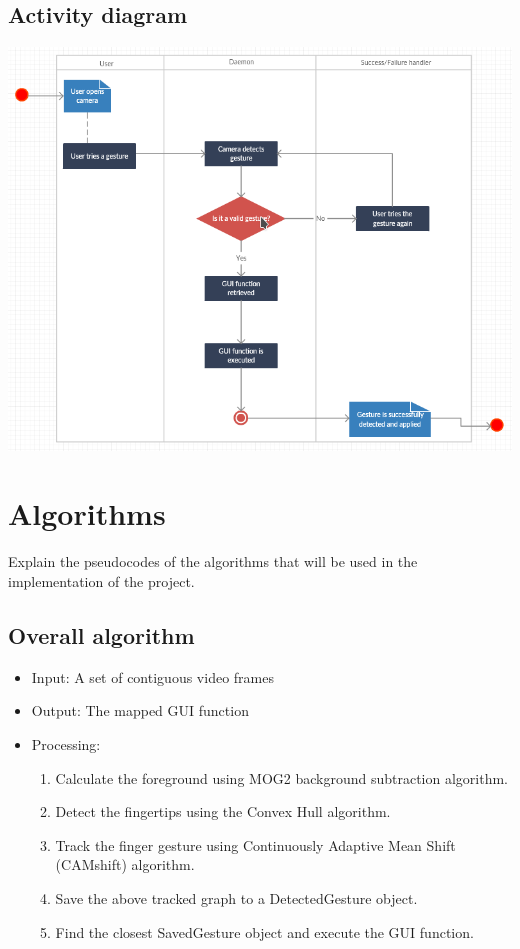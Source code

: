 \documentclass{scrreprt}
\begin{document}
\section{Activity diagram}
\begin{center}
    \includegraphics[scale=0.8]{activitydiagram.png}
\end{center}

\chapter{Algorithms}
Explain the pseudocodes of the algorithms that will be used in the implementation of the project.
\section{Overall algorithm}
\begin{itemize}
    \item Input: A set of contiguous video frames
    \item Output: The mapped GUI function
    \item Processing:
    \begin{enumerate}
        \item Calculate the foreground using MOG2 background subtraction algorithm.
        \item Detect the fingertips using the Convex Hull algorithm.
        \item Track the finger gesture using Continuously Adaptive Mean Shift (CAMshift) algorithm.
        \item Save the above tracked graph to a DetectedGesture object.
        \item Find the closest SavedGesture object and execute the GUI function.
    \end{enumerate}
\end{itemize}
\end{document}
